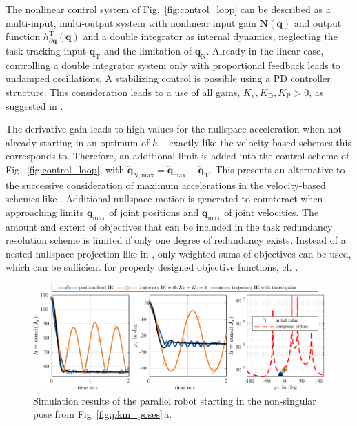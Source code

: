 \documentclass[a4paper,twoside]{article}
\newcommand{\transp}[0]{{\mathrm{T}}}
\begin{document}
The nonlinear control system of Fig.~\ref{fig:control_loop} can be described as a multi-input, multi-output system with nonlinear input gain $\bm{N}(\bm{q})$ and output function $h_{\partial \bm{q}}^\transp(\bm{q})$ and a double integrator as internal dynamics, neglecting the task tracking input $\ddot{\bm{q}}_\mathrm{T}$ and the limitation of $\ddot{\bm{q}}_\mathrm{N}$.
Already in the linear case, controlling a double integrator system only with proportional feedback leads to undamped oscillations.
A stabilizing control is possible using a PD controller structure.
This consideration leads to a use of all gains, $K_\mathrm{v}, K_\mathrm{D},K_\mathrm{P}>0$, as suggested in \cite{DeLucaOriSic1992}.


The derivative gain leads to high values for the nullspace acceleration when not already starting in an optimum of $h$ -- exactly like the velocity-based schemes this corresponds to.
Therefore, an additional limit is added into the control scheme of Fig.~\ref{fig:control_loop}, with $\ddot{\bm{q}}_\mathrm{N,max}=\ddot{\bm{q}}_\mathrm{max}-\ddot{\bm{q}}_\mathrm{T}$.
This presents an alternative to the successive consideration of maximum accelerations in the velocity-based schemes like \cite{SantosSil2017}.
%
Additional nullspace motion is generated to counteract when approaching limits $\bm{q}_\mathrm{max}$ of joint positions and $\dot{\bm{q}}_\mathrm{max}$ of joint velocities.
The amount and extent of objectives that can be included in the task redundancy resolution scheme is limited if only one degree of redundancy exists.
Instead of a nested nullspace projection like in \cite{NakamuraHanYos1987}, only weighted sums of objectives can be used, which can be sufficient for properly designed objective functions, cf. \cite{ZhuQuCaoYan2013}.


%

\begin{figure}[tb] %
	\includegraphics{figures/pkm_nullspace_case1_overview.pdf}
	\caption{Simulation results of the parallel robot starting in the non-singular pose from Fig~\ref{fig:pkm_poses}\,a.}
	\label{fig:pkm_results_from_nonsingular}
\end{figure}
\end{document}
